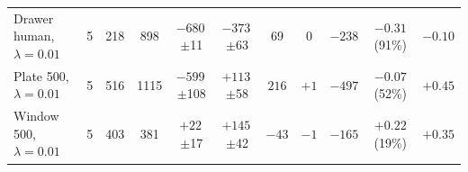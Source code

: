 \begin{table}[t]
\begin{tabular}{lcccccccccc}
Drawer human, $\lambda=0.01$ & 5 & 218 & 898 & $-680$\,{\scriptsize$\pm$11} & $-373$\,{\scriptsize$\pm$63} & $69$ & $0$ & $-238$ & $-0.31$ (91\%) & $-0.10$ \\
Plate 500, $\lambda=0.01$ & 5 & 516 & 1115 & $-599$\,{\scriptsize$\pm$108} & $+113$\,{\scriptsize$\pm$58} & $216$ & $+1$ & $-497$ & $-0.07$ (52\%) & $+0.45$ \\
Window 500, $\lambda=0.01$ & 5 & 403 & 381 & $+22$\,{\scriptsize$\pm$17} & $+145$\,{\scriptsize$\pm$42} & $-43$ & $-1$ & $-165$ & $+0.22$ (19\%) & $+0.35$ \\
\bottomrule
\end{tabular}
\end{table}
